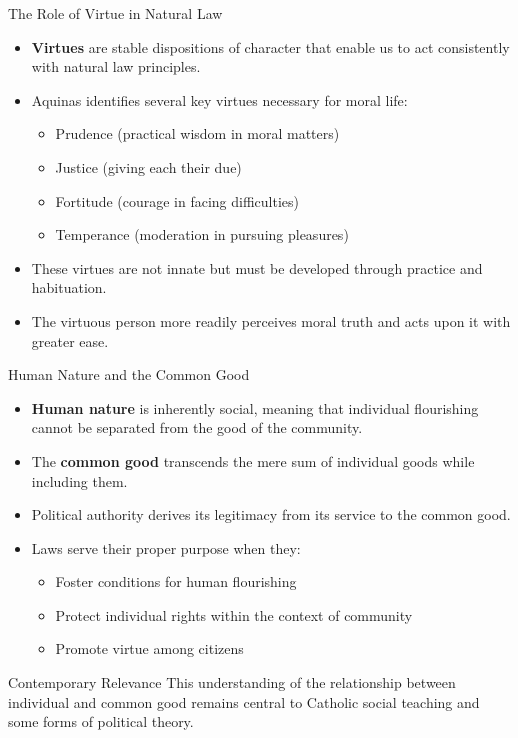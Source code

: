 \documentclass{beamer}
\begin{document}
\begin{frame}{The Role of Virtue in Natural Law}
    \begin{itemize}
        \item \textbf{Virtues} are stable dispositions of character that enable us to act consistently with natural law principles.
        
        \item Aquinas identifies several key virtues necessary for moral life:
            \begin{itemize}
                \item Prudence (practical wisdom in moral matters)
                \item Justice (giving each their due)
                \item Fortitude (courage in facing difficulties)
                \item Temperance (moderation in pursuing pleasures)
            \end{itemize}
        
        \item These virtues are not innate but must be developed through practice and habituation.
        
        \item The virtuous person more readily perceives moral truth and acts upon it with greater ease.
    \end{itemize}
\end{frame}

\begin{frame}{Human Nature and the Common Good}
    \begin{itemize}
        \item \textbf{Human nature} is inherently social, meaning that individual flourishing cannot be separated from the good of the community.
        
        \item The \textbf{common good} transcends the mere sum of individual goods while including them.
        
        \item Political authority derives its legitimacy from its service to the common good.
        
        \item Laws serve their proper purpose when they:
        \begin{itemize}
            \item Foster conditions for human flourishing
            \item Protect individual rights within the context of community
            \item Promote virtue among citizens
        \end{itemize}
    \end{itemize}
    
    \begin{alertblock}{Contemporary Relevance}
        This understanding of the relationship between individual and common good remains central to Catholic social teaching and some forms of political theory.
    \end{alertblock}
\end{frame}
\end{document}
